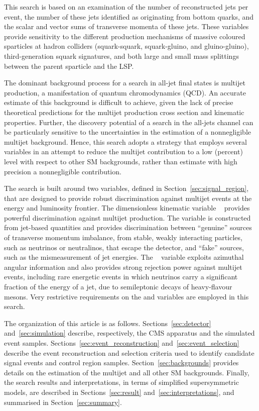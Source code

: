 This search is based on an examination of the number of reconstructed
jets per event, the number of these jets identified as originating
from bottom quarks, and the scalar and vector sums of transverse
momenta of these jets. These variables provide sensitivity to the
different production mechanisms of massive coloured sparticles at
hadron colliders (\ie squark-squark, squark-gluino, and
gluino-gluino), third-generation squark signatures, and both large and
small mass splittings between the parent sparticle and the LSP.

The dominant background process for a search in all-jet final states
is multijet production, a manifestation of quantum chromodynamics
(QCD). An accurate estimate of this background is difficult to
achieve, given the lack of precise theoretical predictions for the
multijet production cross section and kinematic properties. Further,
the discovery potential of a search in the all-jets channel can be
particularly sensitive to the uncertainties in the estimation of a
nonnegligible multijet background. Hence, this search adopts a
strategy that employs several variables in an attempt to reduce the
multijet contribution to a low (percent) level with respect to other
SM backgrounds, rather than estimate with high precision a
nonnegligible contribution.

The search is built around two variables, defined in
Section~\ref{sec:signal_region}, that are designed to provide robust
discrimination against multijet events at the energy and luminosity
frontier. The dimensionless kinematic variable
\alphat~\cite{Randall:2008rw, RA1Paper} provides powerful
discrimination against multijet production. The \alphat variable is
constructed from jet-based quantities and provides discrimination
between ``genuine'' sources of transverse momentum imbalance, from
stable, weakly interacting particles, such as neutrinos or
neutralinos, that escape the detector, and ``fake'' sources, such as
the mismeasurement of jet energies.  The \bdphi~\cite{RA1Paper}
variable exploits azimuthal angular information and also provides
strong rejection power against multijet events, including rare
energetic events in which neutrinos carry a significant fraction of
the energy of a jet, due to semileptonic decays of heavy-flavour
mesons. Very restrictive requirements on the \alphat and \dphi
variables are employed in this search. 

The organization of this article is as
follows. Sections~\ref{sec:detector} and~\ref{sec:simulation}
describe, respectively, the CMS apparatus and the simulated event
samples. Sections~\ref{sec:event_reconstruction}
and~\ref{sec:event_selection} describe the event reconstruction and
selection criteria used to identify candidate signal events and
control region samples. Section~\ref{sec:backgrounds} provides details
on the estimation of the multijet and all other SM
backgrounds. Finally, the search results and interpretations, in terms
of simplified supersymmetric models, are described in
Sections~\ref{sec:result} and~\ref{sec:interpretations}, and
summarised in Section~\ref{sec:summary}.


